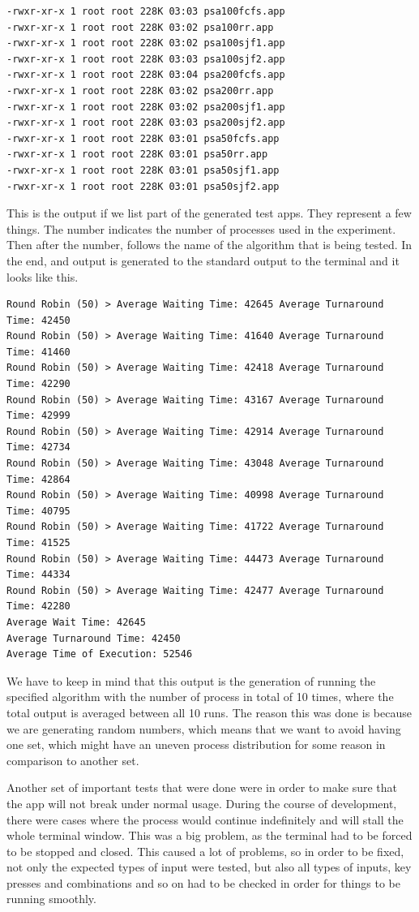 \documentclass{article}
\begin{document}
\begin{lstlisting}
-rwxr-xr-x 1 root root 228K 03:03 psa100fcfs.app
-rwxr-xr-x 1 root root 228K 03:02 psa100rr.app
-rwxr-xr-x 1 root root 228K 03:02 psa100sjf1.app
-rwxr-xr-x 1 root root 228K 03:03 psa100sjf2.app
-rwxr-xr-x 1 root root 228K 03:04 psa200fcfs.app
-rwxr-xr-x 1 root root 228K 03:02 psa200rr.app
-rwxr-xr-x 1 root root 228K 03:02 psa200sjf1.app
-rwxr-xr-x 1 root root 228K 03:03 psa200sjf2.app
-rwxr-xr-x 1 root root 228K 03:01 psa50fcfs.app
-rwxr-xr-x 1 root root 228K 03:01 psa50rr.app
-rwxr-xr-x 1 root root 228K 03:01 psa50sjf1.app
-rwxr-xr-x 1 root root 228K 03:01 psa50sjf2.app
\end{lstlisting}

This is the output if we list part of the generated test apps. They represent a few things. The number indicates the number of processes used in the experiment. Then after the number, follows the name of the algorithm that is being tested. In the end, and output is generated to the standard output to the terminal and it looks like this.

\begin{lstlisting}
Round Robin (50) > Average Waiting Time: 42645 Average Turnaround Time: 42450
Round Robin (50) > Average Waiting Time: 41640 Average Turnaround Time: 41460
Round Robin (50) > Average Waiting Time: 42418 Average Turnaround Time: 42290
Round Robin (50) > Average Waiting Time: 43167 Average Turnaround Time: 42999
Round Robin (50) > Average Waiting Time: 42914 Average Turnaround Time: 42734
Round Robin (50) > Average Waiting Time: 43048 Average Turnaround Time: 42864
Round Robin (50) > Average Waiting Time: 40998 Average Turnaround Time: 40795
Round Robin (50) > Average Waiting Time: 41722 Average Turnaround Time: 41525
Round Robin (50) > Average Waiting Time: 44473 Average Turnaround Time: 44334
Round Robin (50) > Average Waiting Time: 42477 Average Turnaround Time: 42280
Average Wait Time: 42645
Average Turnaround Time: 42450
Average Time of Execution: 52546
\end{lstlisting}

We have to keep in mind that this output is the generation of running the specified algorithm with the number of process in total of 10 times, where the total output is averaged between all 10 runs. The reason this was done is because we are generating random numbers, which means that we want to avoid having one set, which might have an uneven process distribution for some reason in comparison to another set.

Another set of important tests that were done were in order to make sure that the app will not break under normal usage. During the course of development, there were cases where the process would continue indefinitely and will stall the whole terminal window. This was a big problem, as the terminal had to be forced to be stopped and closed. This caused a lot of problems, so in order to be fixed, not only the expected types of input were tested, but also all types of inputs, key presses and combinations and so on had to be checked in order for things to be running smoothly.
\end{document}
